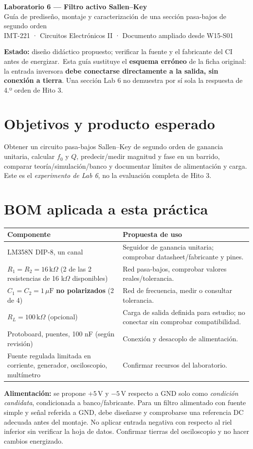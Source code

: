 \documentclass[10pt,a4paper]{article}
\newcommand{\status}{\textbf{Estado:} diseño didáctico propuesto; verificar la fuente y el fabricante del CI antes de energizar.}
\begin{document}
\begin{center}
{\Large\bfseries\textcolor{ucbblue}{Laboratorio 6 — Filtro activo Sallen–Key}}\\[2mm]
{\large Guía de prediseño, montaje y caracterización de una sección pasa-bajos de segundo orden}\\
\small IMT-221 · Circuitos Electrónicos II · Documento ampliado desde W15-S01
\end{center}
\begin{note}\status\ Esta guía sustituye el \textbf{esquema erróneo} de la ficha original: la entrada inversora \textbf{debe conectarse directamente a la salida, sin conexión a tierra}. Una sección Lab 6 no demuestra por sí sola la respuesta de 4.º orden de Hito 3.\end{note}
\section{Objetivos y producto esperado}
Obtener un circuito pasa-bajos Sallen–Key de segundo orden de ganancia unitaria, calcular $f_0$ y $Q$, predecir/medir magnitud y fase en un barrido, comparar teoría/simulación/banco y documentar límites de alimentación y carga. Este es el \emph{experimento de Lab 6}, no la evaluación completa de Hito 3.
\section{BOM aplicada a esta práctica}
\begin{tabularx}{\linewidth}{@{}P{3.4cm}Y@{}}\toprule
Componente & Propuesta de uso \\ \midrule
LM358N DIP-8, un canal & Seguidor de ganancia unitaria; comprobar datasheet/fabricante y pines.\\
$R_1=R_2=16\,\mathrm{k}\Omega$ (2 de las 2 resistencias de 16 k$\Omega$ disponibles) & Red pasa-bajos, comprobar valores reales/tolerancia.\\
$C_1=C_2=1\,\mu\mathrm{F}$ \textbf{no polarizados} (2 de 4) & Red de frecuencia, medir o consultar tolerancia.\\
$R_L=100\,\mathrm{k}\Omega$ (opcional) & Carga de salida definida para estudio; no conectar sin comprobar compatibilidad.\\
Protoboard, puentes, 100 nF (según revisión) & Conexión y desacoplo de alimentación.\\
Fuente regulada limitada en corriente, generador, osciloscopio, multímetro & Confirmar recursos del laboratorio. \\ \bottomrule\end{tabularx}
\begin{caution}\textbf{Alimentación:} se propone $+5\,\mathrm{V}$ y $-5\,\mathrm{V}$ respecto a GND solo como \emph{condición candidata}, condicionada a banco/fabricante. Para un filtro alimentado con fuente simple y señal referida a GND, debe diseñarse y comprobarse una referencia DC adecuada antes del montaje. No aplicar entrada negativa con respecto al riel inferior sin verificar la hoja de datos. Confirmar tierras del osciloscopio y no hacer cambios energizado.\end{caution}
\end{document}
